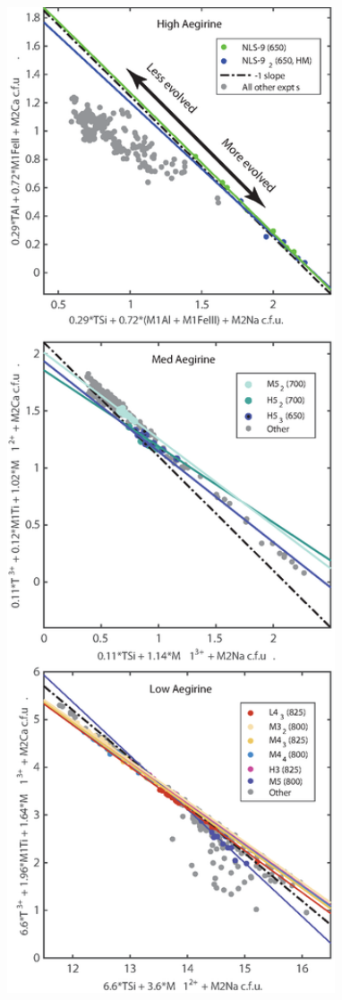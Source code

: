 \documentclass[review,authoryear,12pt]{elsarticle}
\begin{document}
        \begin{figure}[htpb]
\begin{center}
  \begin{minipage}[c]{.47\linewidth}
  \null
\includegraphics[width=1\textwidth]{S3_ExchMech_Feb2017-02.eps}

\end{minipage}
\end{center}
\end{figure}
\end{document}
